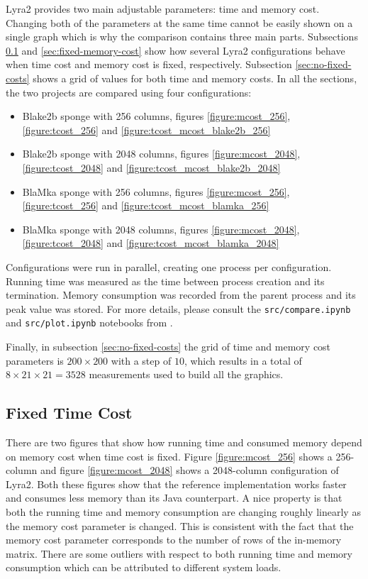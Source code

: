 Lyra2 provides two main adjustable parameters: time and memory cost. Changing both of the parameters at the same time cannot be easily shown on a single graph which is why the comparison contains three main parts. Subsections \ref{sec:fixed-time-cost} and \ref{sec:fixed-memory-cost} show how several Lyra2 configurations behave when time cost and memory cost is fixed, respectively. Subsection \ref{sec:no-fixed-costs} shows a grid of values for both time and memory costs. In all the sections, the two projects are compared using four configurations:

\begin{itemize}
    \item Blake2b sponge with 256 columns, figures \ref{figure:mcost_256}, \ref{figure:tcost_256} and \ref{figure:tcost_mcost_blake2b_256}
    \item Blake2b sponge with 2048 columns, figures \ref{figure:mcost_2048}, \ref{figure:tcost_2048} and \ref{figure:tcost_mcost_blake2b_2048}
    \item BlaMka sponge with 256 columns, figures \ref{figure:mcost_256}, \ref{figure:tcost_256} and \ref{figure:tcost_mcost_blamka_256}
    \item BlaMka sponge with 2048 columns, figures \ref{figure:mcost_2048}, \ref{figure:tcost_2048} and \ref{figure:tcost_mcost_blamka_2048}
  \end{itemize}

Configurations were run in parallel, creating one process per configuration. Running time was measured as the time between process creation and its termination. Memory consumption was recorded from the parent process and its peak value was stored. For more details, please consult the \texttt{src/compare.ipynb} and \texttt{src/plot.ipynb} notebooks from \cite{github:2017:lyra2-compare}.

Finally, in subsection \ref{sec:no-fixed-costs} the grid of time and memory cost parameters is \(200 \times 200\) with a step of \(10\), which results in a total of \(8 \times 21 \times 21 = 3528\) measurements used to build all the graphics.

\subsection{Fixed Time Cost}
\label{sec:fixed-time-cost}

There are two figures that show how running time and consumed memory depend on memory cost when time cost is fixed. Figure \ref{figure:mcost_256} shows a 256-column and figure \ref{figure:mcost_2048} shows a 2048-column configuration of Lyra2. Both these figures show that the reference implementation works faster and consumes less memory than its Java counterpart. A nice property is that both the running time and memory consumption are changing roughly linearly as the memory cost parameter is changed. This is consistent with the fact that the memory cost parameter corresponds to the number of rows of the in-memory matrix. There are some outliers with respect to both running time and memory consumption which can be attributed to different system loads.

